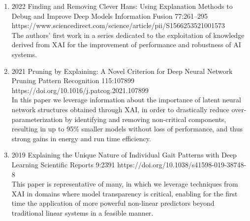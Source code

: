     
        \begin{enumerate}[resume]

        
            \item
                            {2022}
                            {Finding and Removing Clever Hans: Using Explanation Methods to Debug and Improve Deep Models}
                            {Information Fusion}
                            {77:261--295}
                            {https://www.sciencedirect.com/science/article/pii/S1566253521001573}
                            {\\
                            The authors' first work in a series dedicated to the exploitation of knowledge derived from XAI for the improvement of performance and robustness of AI systems.}

            
            \item {}
                        {2021}
                        {Pruning by Explaining: A Novel Criterion for Deep Neural Network Pruning}
                        {Pattern Recognition}
                        {115:107899}
                        {https://doi.org/10.1016/j.patcog.2021.107899}
                        {\\
                        In this paper we leverage information about the importance of latent neural network structures obtained through XAI, in order to drastically reduce over-parameterization by identifying and removing non-critical components, resulting in up to 95\% smaller models without loss of performance, and thus strong gains in energy and run time efficiency.
                        }
                        
                        
            \item {}
                        {2019}
                        {Explaining the Unique Nature of Individual Gait Patterns with Deep Learning}
                        {Scientific Reports}
                        {9:2391}
                        {https://doi.org/10.1038/s41598-019-38748-8}
                        {\\
                        This paper is representative of many, in which we leverage techniques from XAI in domains where model transparency is critical, enabling for the first time the application of more powerful non-linear predictors beyond traditional linear systems in a feasible manner.}
                            

\end{enumerate}
